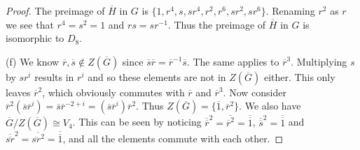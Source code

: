 \documentclass{article}
\begin{document}
\begin{proof}
The preimage of $\overline{H}$ in $G$ is $\{1, r^4, s, sr^4, r^2, r^6, sr^2, sr^6\}$. Renaming $r^2$ as $r$ we see that $r^4 = s^2 = 1$ and $rs = sr^{-1}$. Thus the preimage of $\overline{H}$ in $G$ is isomorphic to $D_8$.

(f) We know $\overline{r},\overline{s} \notin Z(\overline{G})$ since $\overline{s}\overline{r} = \overline{r}^{-1}\overline{s}$. The same applies to $\overline{r}^3$. Multiplying $s$ by $sr^i$ results in $r^i$ and so these elements are not in $Z(\overline{G})$ either. This only leaves $\overline{r}^2$, which obviously commutes with $\overline{r}$ and $\overline{r}^3$. Now consider $\overline{r}^2(\overline{s}\overline{r}^i) = \overline{s}\overline{r}^{-2+i} = (\overline{s}\overline{r}^i)\overline{r}^2$. Thus $Z(\overline{G}) = \{\overline{1},\overline{r}^2\}$. We also have $\overline{G}/Z(\overline{G}) \cong V_4$. This can be seen by noticing $\overline{\overline{r}}^2 = \overline{\overline{r}^2} = \overline{\overline{1}}$, $\overline{\overline{s}}^2 = \overline{\overline{1}}$ and $\overline{\overline{sr}}^2 = \overline{\overline{sr}^2} = \overline{\overline{1}}$, and all the elements commute with each other.
\end{proof}
\end{document}
